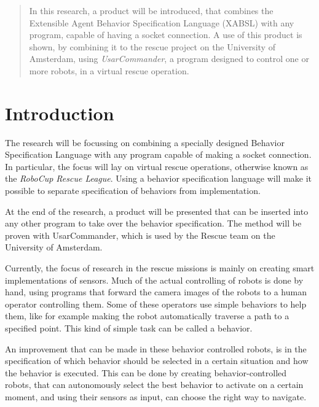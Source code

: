 \documentclass[a4paper,10pt]{article}
\begin{document}

\thispagestyle{empty}
\tableofcontents
\setcounter{page}{0}
\newpage
\begin{abstract}
In this research, a product will be introduced, that combines the Extensible
Agent Behavior Specification Language (XABSL) with any program, capable of
having a socket connection. A use of this product is shown, by combining it to
the rescue project on the University of Amsterdam, using
\textit{UsarCommander},
a program designed to control one or more robots, in a virtual rescue operation.
\end{abstract}
\section{Introduction}
The research will be focussing on combining 
a specially designed Behavior Specification Language 
 with any program capable of making a
socket connection. In particular, the focus will lay on virtual rescue
operations, otherwise known as the \textit{RoboCup Rescue League}. Using a
behavior specification language will make it possible to separate specification
of behaviors from implementation.

At the end of the research, a product will be presented that can be inserted
into any other program to take over the behavior specification. The method will
be proven with UsarCommander, which is used by the Rescue team on the University
of Amsterdam.

Currently, the focus of research in the rescue missions is mainly on creating
smart implementations of sensors. Much of the actual controlling of robots is
done by hand, using programs that forward the camera images of the robots to a
human operator controlling them. Some of these operators use simple behaviors to
help them, like for example making the robot automatically traverse a path to a
specified point. This kind of simple task can be called a behavior.

An improvement that can be made in these behavior controlled robots, is in 
the specification of which behavior should be selected in a certain situation
and how the behavior is executed. This can be done by creating
behavior-controlled robots, that can autonomously select the best behavior to
activate on a certain moment, and using their sensors as input, can choose the
right way to navigate.

%
\end{document}
